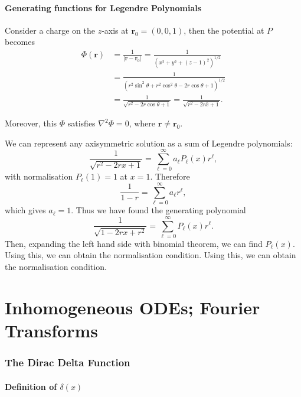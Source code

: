 \documentclass[12pt]{article}
\begin{document}
\subsection{Generating functions for Legendre Polynomials}%
\label{sub:generating_functions_for_legendre_polynomials}

Consider a charge on the $z$-axis at $\mathbf{r}_0 = (0, 0, 1)$, then the potential at $P$ becomes
\begin{align*}
	\Phi(\mathbf{r}) &= \frac{1}{|\mathbf{r} - \mathbf{r}_0|}= \frac{1}{(x^2 + y^2 + (z - 1)^2)^{1/2}} \\
			 &= \frac{1}{(r^2 \sin^2 \theta + r^2 \cos^2\theta - 2 r \cos \theta + 1)^{1/2}} \\ 
			 &= \frac{1}{\sqrt{r^2 - 2r \cos \theta + 1}} = \frac{1}{\sqrt{r^2 - 2 r \bar x + 1}}.
\end{align*}

Moreover, this $\Phi$ satisfies $\nabla^2 \Phi = 0$, where $\mathbf{r} \neq \mathbf{r}_0$.

We can represent any axisymmetric solution as a sum of Legendre polynomials:
\[
	\frac{1}{\sqrt{r^2 - 2rx + 1}} = \sum_{\ell = 0}^{\infty} a_{\ell} P_{\ell}(x) r^{\ell}
,\]
with normalisation $P_\ell(1) = 1$ at $x = 1$. Therefore
\[
\frac{1}{1 - r} = \sum_{\ell = 0}^{\infty}a_{\ell}r^{\ell}
,\]
which gives $a_{\ell} = 1$. Thus we have found the generating polynomial
\[
	\frac{1}{\sqrt{1 - 2rx + r^2}} = \sum_{\ell = 0}^{\infty} P_{\ell}(x) r^{\ell}
.\]
Then, expanding the left hand side with binomial theorem, we can find $P_{\ell}(x)$. Using this, we can obtain the normalisation condition. Using this, we can obtain the normalisation condition.

\newpage

\part{Inhomogeneous ODEs; Fourier Transforms}%
\label{prt:inhomogeneous_odes_fourier_transforms}

\section{The Dirac Delta Function}%
\label{sec:the_dirac_delta_function}

\subsection{Definition of \texorpdfstring{$\delta(x)$}{Delta function}}%
\label{sub:definition_of_delta_function}
\end{document}

